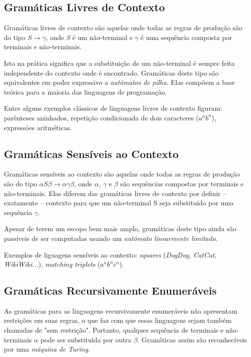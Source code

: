 \documentclass[a4paper,12pt,oneside,onecolumn]{uerj}
\begin{document}
\subsection{Gramáticas Livres de Contexto}

Gramáticas livres de contexto são aquelas onde todas as regras de produção são do tipo $S \rightarrow \gamma$, onde \emph{S} é um não-terminal e $\gamma$ é uma sequência composta por terminais e não-terminais. 

Isto na prática significa que a substituição de um não-terminal é sempre feita independente do contexto onde é encontrado. Gramáticas deste tipo são equivalentes em poder expressivo a \emph{autômatos de pilha}. Elas compõem a base teórica para a maioria das linguagens de programação. 

Entre alguns exemplos clássicos de linguagens livres de contexto figuram: parênteses aninhados, repetição condicionada de dois caracteres ($a^nb^n$), expressões aritméticas.

\subsection{Gramáticas Sensíveis ao Contexto}
Gramáticas sensíveis ao contexto são aquelas onde todas as regras de produção são do tipo $\alpha S\beta\rightarrow \alpha\gamma\beta$, onde $\alpha$, $\gamma$ e $\beta$ são sequências compostas por terminais e não-terminais. Elas diferem das gramáticas livres de contexto por definir -- exatamente -- contexto para que um não-terminal S seja substituído por uma sequência $\gamma$. 

Apesar de terem um escopo bem mais amplo, gramáticas deste tipo ainda são passíveis de ser computadas usando um \emph{autômato linearmente limitado}. 

Exemplos de liguagens sensíveis ao contexto: \emph{squares} (\emph{DogDog, CatCat, WikiWiki...}), \emph{matching triplets} ($a^nb^nc^n$).

\subsection{Gramáticas Recursivamente Enumeráveis}

As gramáticas para as linguagens recursivamente enumeráveis não apresentam restrições em suas regras, o que faz com que essas linguagens sejam também chamadas de "sem restrição". Portanto, qualquer sequência de terminais e não-terminais $\alpha$ pode ser substituída por outra $\beta$. Gramáticas assim são reconhecíveis por uma \emph{máquina de Turing}. 
\end{document}
